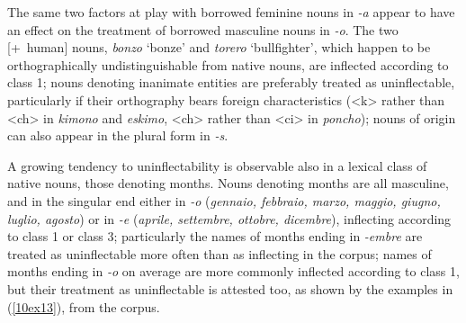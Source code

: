 \documentclass[output=paper,colorlinks,citecolor=brown]{langscibook}
\begin{document}
The same two factors at play with borrowed feminine nouns in \emph{-a} appear to have an effect on the treatment of borrowed masculine nouns in \emph{-o}. The two [+~human] nouns, \emph{bonzo} `bonze' and \emph{torero} `bullfighter', which happen to be orthographically undistinguishable from native nouns, are inflected according to class 1; nouns denoting inanimate entities are preferably treated as uninflectable, particularly if their orthography bears foreign characteristics (\textless k\textgreater{} rather than \textless ch\textgreater{} in \emph{kimono} and \emph{eskimo}, \textless ch\textgreater{} rather than \textless ci\textgreater{} in \emph{poncho}); nouns of  origin can also appear in the  plural form in \emph{-s}.

A growing tendency to uninflectability is observable also in a lexical class of native nouns, those denoting months. Nouns denoting months are all masculine, and in the singular end either in \emph{-o} (\emph{gennaio, febbraio, marzo, maggio, giugno, luglio, agosto}) or in \emph{-e} (\emph{aprile, settembre, ottobre, dicembre}), inflecting according to class 1 or class 3; particularly the names of months ending in \emph{-embre} are treated as uninflectable more often than as inflecting in the  corpus; names of months ending in \emph{-o} on average are more commonly inflected according to class 1, but their treatment as uninflectable is attested too, as shown by the examples in (\ref{10ex13}), from the  corpus.
\end{document}
